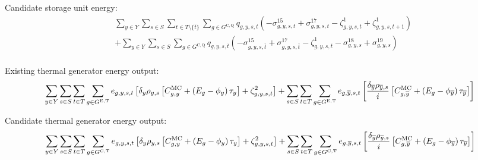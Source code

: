 \documentclass{article}
\newcommand{\sGeneratorsExistingThermal}{G^{\mathrm{E,T}}}
\newcommand{\sGeneratorsCandidateThermal}{G^{\mathrm{C,T}}}
\newcommand{\sStorageCandidate}{G^{\mathrm{C,Q}}}
\newcommand{\sYears}{Y}
\newcommand{\sScenarios}{S}
\newcommand{\sIntervals}{T}
\newcommand{\iGenerator}{g}
\newcommand{\iYear}{y}
\newcommand{\iYearTerminal}{\overline{\iYear}}
\newcommand{\iScenario}{s}
\newcommand{\iInterval}{t}
\newcommand{\iIntervalTerminal}{\overline{\iInterval}}
\newcommand{\cScenarioDuration}[1][\iYear,\iScenario]{\rho_{#1}}
\newcommand{\cMarginalCost}[1][\iGenerator,\iYear]{C^{\mathrm{MC}}_{#1}}
\newcommand{\cEmissionsIntensity}[1][\iGenerator]{E_{#1}}
\newcommand{\cInterestRate}{i}
\newcommand{\cDiscountRate}[1][\iYear]{\delta_{#1}}
\newcommand{\vBaseline}[1][\iYear]{\phi_{#1}}
\newcommand{\vPermitPrice}[1][\iYear]{\tau_{#1}}
\newcommand{\vEnergy}[1][\iGenerator,\iYear,\iScenario,\iInterval]{e_{#1}}
\newcommand{\vStorageUnitEnergy}[1][\iGenerator,\iYear,\iScenario,\iInterval]{q_{#1}}
\newcommand{\dNonNegativeStorageEnergy}[1][\iGenerator,\iYear,\iScenario,\iInterval]{\sigma_{#1}^{15}}
\newcommand{\dMaxStorageEnergyCandidate}[1][\iGenerator,\iYear,\iScenario,\iInterval]{\sigma_{#1}^{17}}
\newcommand{\dMinStorageEnergyIntervalEnd}[1][\iGenerator,\iYear,\iScenario]{\sigma_{#1}^{18}}
\newcommand{\dMaxStorageEnergyIntervalEnd}[1][\iGenerator,\iYear,\iScenario]{\sigma_{#1}^{19}}
\newcommand{\dStorageEnergyTransition}[1][\iGenerator,\iYear,\iScenario,\iInterval]{\zeta_{#1}^{1}}
\newcommand{\dGeneratorEnergyOutput}[1][\iGenerator,\iYear,\iScenario,\iInterval]{\zeta_{#1}^{2}}
\begin{document}
Candidate storage unit energy:
\begin{align}
	& \sum\limits_{\iYear \in \sYears}\sum\limits_{\iScenario \in \sScenarios} \sum\limits_{\iInterval \in \sIntervals \setminus \{\iIntervalTerminal\}} \sum\limits_{\iGenerator \in \sStorageCandidate} \vStorageUnitEnergy \left(- \dNonNegativeStorageEnergy + \dMaxStorageEnergyCandidate - \dStorageEnergyTransition + \dStorageEnergyTransition[\iGenerator,\iYear,\iScenario,\iInterval+1] \right)\\
	& + \sum\limits_{\iYear \in \sYears}\sum\limits_{\iScenario \in \sScenarios}\sum\limits_{\iGenerator \in \sStorageCandidate} \vStorageUnitEnergy[\iGenerator,\iYear,\iScenario,\iIntervalTerminal] \left(- \dNonNegativeStorageEnergy[\iGenerator,\iYear,\iScenario,\iIntervalTerminal] + \dMaxStorageEnergyCandidate[\iGenerator,\iYear,\iScenario,\iIntervalTerminal] - \dStorageEnergyTransition[\iGenerator,\iYear,\iScenario,\iIntervalTerminal] - \dMinStorageEnergyIntervalEnd + \dMaxStorageEnergyIntervalEnd \right)\\
\end{align}

Existing thermal generator energy output:
\begin{equation}
	\sumIntervals \sum\limits_{\iGenerator \in \sGeneratorsExistingThermal} \vEnergy \left[\cDiscountRate \cScenarioDuration \left[\cMarginalCost + \left(\cEmissionsIntensity - \vBaseline\right)\vPermitPrice \right]  + \dGeneratorEnergyOutput\right] + \sum\limits_{\iScenario \in \sScenarios} \sum\limits_{\iInterval \in \sIntervals} \sum\limits_{\iGenerator \in \sGeneratorsExistingThermal} \vEnergy[\iGenerator,\iYearTerminal,\iScenario,\iInterval] \left[ \frac{\cDiscountRate[\iYearTerminal] \cScenarioDuration[\iYearTerminal,\iScenario]}{\cInterestRate} \left[\cMarginalCost[\iGenerator,\iYearTerminal] + \left(\cEmissionsIntensity - \vBaseline[\iYearTerminal]\right)\vPermitPrice[\iYearTerminal] \right]\right]
\end{equation}

Candidate thermal generator energy output:
\begin{equation}
	\sumIntervals \sum\limits_{\iGenerator \in \sGeneratorsCandidateThermal} \vEnergy \left[\cDiscountRate \cScenarioDuration \left[\cMarginalCost + \left(\cEmissionsIntensity - \vBaseline\right)\vPermitPrice \right]  + \dGeneratorEnergyOutput\right] + \sum\limits_{\iScenario \in \sScenarios} \sum\limits_{\iInterval \in \sIntervals} \sum\limits_{\iGenerator \in \sGeneratorsCandidateThermal} \vEnergy[\iGenerator,\iYearTerminal,\iScenario,\iInterval] \left[ \frac{\cDiscountRate[\iYearTerminal] \cScenarioDuration[\iYearTerminal,\iScenario]}{\cInterestRate} \left[\cMarginalCost[\iGenerator,\iYearTerminal] + \left(\cEmissionsIntensity - \vBaseline[\iYearTerminal]\right)\vPermitPrice[\iYearTerminal] \right]\right]
\end{equation}
\end{document}
